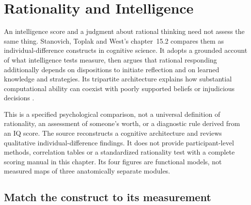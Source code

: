\chapter{Rationality and Intelligence}
\label{sec:p19-rationality-15-2}

An intelligence score and a judgment about rational thinking need not assess
the same thing. Stanovich, Toplak and West's chapter~15.2 compares them as
individual-difference constructs in cognitive science. It adopts a grounded
account of what intelligence tests measure, then argues that rational
responding additionally depends on dispositions to initiate reflection and
on learned knowledge and strategies. Its tripartite architecture explains
how substantial computational ability can coexist with poorly supported
beliefs or injudicious decisions
\cite[pp.~791--800]{StanovichToplakWest2021Intelligence}.

This is a specified psychological comparison, not a universal definition of
rationality, an assessment of someone's worth, or a diagnostic rule derived
from an IQ score. The source reconstructs a cognitive architecture and
reviews qualitative individual-difference findings. It does not provide
participant-level methods, correlation tables or a standardized rationality
test with a complete scoring manual in this chapter. Its four figures are
functional models, not measured maps of three anatomically separate modules.

\section{Match the construct to its measurement}
\label{sec:p19-rat152-constructs}

